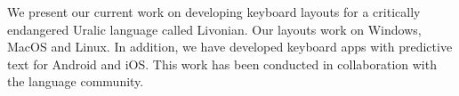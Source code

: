 We present our current work on developing keyboard layouts for a critically endangered Uralic language called Livonian. Our layouts work on Windows, MacOS and Linux. In addition, we have developed keyboard apps with predictive text for Android and iOS. This work has been conducted in collaboration with the language community.
